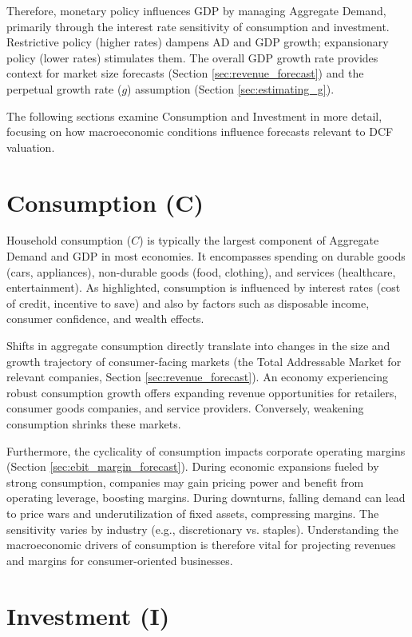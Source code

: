 Therefore, monetary policy influences GDP by managing Aggregate Demand, primarily through the interest rate sensitivity of consumption and investment. Restrictive policy (higher rates) dampens AD and GDP growth; expansionary policy (lower rates) stimulates them. The overall GDP growth rate provides context for market size forecasts (Section \ref{sec:revenue_forecast}) and the perpetual growth rate (\(g\)) assumption (Section \ref{sec:estimating_g}).

The following sections examine Consumption and Investment in more detail, focusing on how macroeconomic conditions influence forecasts relevant to DCF valuation.

\section{Consumption (C)} \label{sec:consumption}

Household consumption (\(C\)) is typically the largest component of Aggregate Demand and GDP in most economies. It encompasses spending on durable goods (cars, appliances), non-durable goods (food, clothing), and services (healthcare, entertainment). As highlighted, consumption is influenced by interest rates (cost of credit, incentive to save) and also by factors such as disposable income, consumer confidence, and wealth effects.

Shifts in aggregate consumption directly translate into changes in the size and growth trajectory of consumer-facing markets (the Total Addressable Market for relevant companies, Section \ref{sec:revenue_forecast}). An economy experiencing robust consumption growth offers expanding revenue opportunities for retailers, consumer goods companies, and service providers. Conversely, weakening consumption shrinks these markets.

Furthermore, the cyclicality of consumption impacts corporate operating margins (Section \ref{sec:ebit_margin_forecast}). During economic expansions fueled by strong consumption, companies may gain pricing power and benefit from operating leverage, boosting margins. During downturns, falling demand can lead to price wars and underutilization of fixed assets, compressing margins. The sensitivity varies by industry (e.g., discretionary vs. staples). Understanding the macroeconomic drivers of consumption is therefore vital for projecting revenues and margins for consumer-oriented businesses.

\section{Investment (I)} \label{sec:investment}


